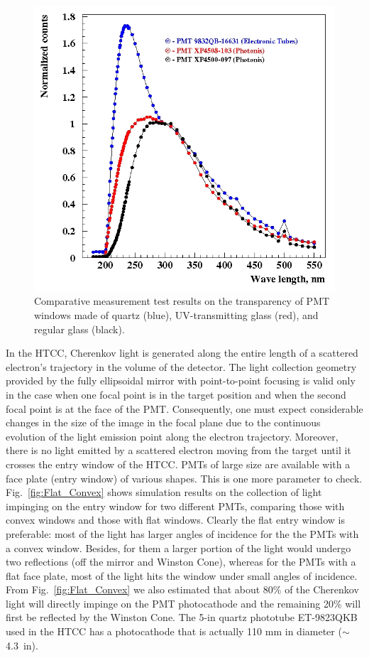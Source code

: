 \begin{figure}[!ht]
    \centering
    \includegraphics[width=1.0\linewidth,trim={1.7cm 0.5cm 0.05cm 0.1cm},clip]{images/Quartz_UV_glass.jpg}
    \caption{Comparative measurement test results on the transparency of PMT windows made of quartz (blue),
      UV-transmitting glass (red), and regular glass (black).}
    \label{fig:Quartz_UV_glass}
\end{figure}

In the HTCC, Cherenkov light is generated along the entire length of a scattered electron's trajectory in the volume
of the detector. The light collection geometry provided by the fully ellipsoidal mirror with point-to-point focusing is
valid only in the case when one focal point is in the target position and when the second focal point is at the face of
the PMT. Consequently, one must expect considerable changes in the size of the image in the focal plane due to the
continuous evolution of the light emission point along the electron trajectory. Moreover, there is no light emitted by
a scattered electron moving from the target until it crosses the entry window of the HTCC. PMTs of large size are
available with a face plate (entry window) of various shapes. This is one more parameter to check.
Fig.~\ref{fig:Flat_Convex} shows simulation results on the collection of light impinging on the entry window for two
different PMTs, comparing those with convex windows and those with flat windows. Clearly the flat entry window is
preferable: most of the light has larger angles of incidence for the the PMTs with a convex window. Besides,
for them a larger portion of the light would undergo two reflections (off the mirror and Winston Cone), whereas for
the PMTs with a flat face plate, most of the light hits the window under small angles of incidence. From
Fig.~\ref{fig:Flat_Convex} we also estimated that about 80\% of the Cherenkov light will directly impinge on the
PMT photocathode and the remaining 20\% will first be reflected by the Winston Cone. The 5-in quartz phototube
ET-9823QKB used in the HTCC has a photocathode that is actually 110 mm in diameter ($\sim$4.3~in). 

